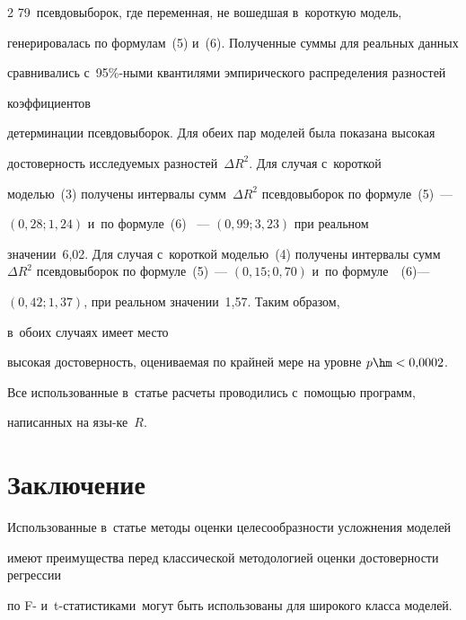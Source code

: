 \begin{multicols}{2}
79~псевдовыборок, где переменная, не вошедшая в~короткую модель, 


генерировалась по формулам~(5) и~(6). Полученные суммы для реальных данных 


сравнивались с~95\%-ными квантилями эмпирического распределения разностей 


коэффициентов 


детерминации псевдовыборок. Для обеих пар моделей была показана высокая 


достоверность исследуемых разностей~$\Delta R^2$. Для случая с~короткой 


моделью~(3) получены интервалы сумм~$\Delta R^2$ псевдовыборок по формуле~(5)~--- 


$ (0{,}28; 1{,}24)$ и~по формуле~(6) ~--- $(0{,}99; 3{,}23)$ при реальном 


значении~6,02. Для случая с~короткой моделью~(4) получены интервалы сумм~$\Delta 


R^2$ псевдовыборок по формуле~(5)~--- $ (0{,}15; 0{,}70)$ и~по формуле~~(6)--- 


$(0{,}42; 1{,}37)$, при реальном значении~1,57. Таким образом,


 в~обоих случаях имеет место 


высокая достоверность, оцениваемая по крайней мере на уровне $p\hm < 0{,}0002$.


  


  Все использованные в~статье расчеты проводились с~помощью программ, 


написанных на язы-\linebreak ке~$R$.










\section{Заключение}





  Использованные в~статье методы оценки целесообразности усложнения моделей 


имеют преимущества перед классической методологией оценки достоверности регрессии 


по F- и~t-ста\-ти\-сти\-кам\linebreak и~могут быть использованы для широкого класса моделей. 



\end{multicols}
